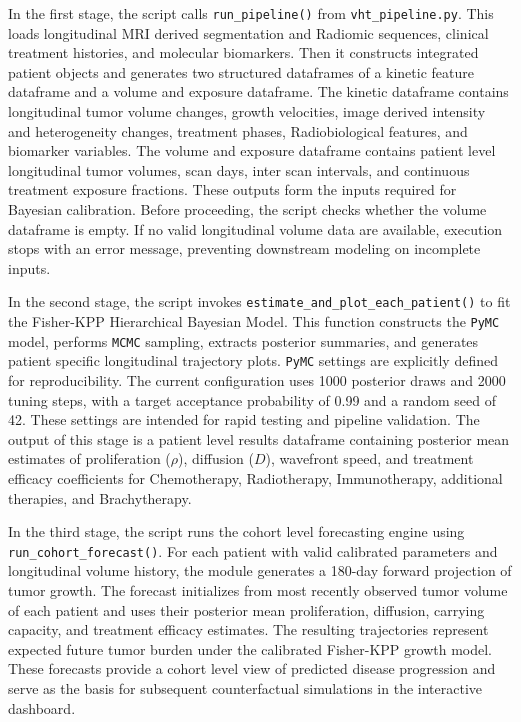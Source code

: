 In the first stage, the script calls \texttt{run\_pipeline()} from \texttt{vht\_pipeline.py}. This loads longitudinal MRI derived segmentation and Radiomic sequences, clinical treatment histories, and molecular biomarkers. Then it constructs integrated patient objects and generates two structured dataframes of a kinetic feature dataframe and a volume and exposure dataframe. The kinetic dataframe contains longitudinal tumor volume changes, growth velocities, image derived intensity and heterogeneity changes, treatment phases, Radiobiological features, and biomarker variables. The volume and exposure dataframe contains patient level longitudinal tumor volumes, scan days, inter scan intervals, and continuous treatment exposure fractions. These outputs form the inputs required for Bayesian calibration. Before proceeding, the script checks whether the volume dataframe is empty. If no valid longitudinal volume data are available, execution stops with an error message, preventing downstream modeling on incomplete inputs.

In the second stage, the script invokes \texttt{estimate\_and\_plot\_each\_patient()} to fit the Fisher-KPP Hierarchical Bayesian Model. This function constructs the \texttt{PyMC} model, performs \texttt{MCMC} sampling, extracts posterior summaries, and generates patient specific longitudinal trajectory plots. \texttt{PyMC} settings are explicitly defined for reproducibility. The current configuration uses 1000 posterior draws and 2000 tuning steps, with a target acceptance probability of 0.99 and a random seed of 42. These settings are intended for rapid testing and pipeline validation. The output of this stage is a patient level results dataframe containing posterior mean estimates of proliferation ($\rho$), diffusion ($D$), wavefront speed, and treatment efficacy coefficients for Chemotherapy, Radiotherapy, Immunotherapy, additional therapies, and Brachytherapy.

In the third stage, the script runs the cohort level forecasting engine using \texttt{run\_cohort\_forecast()}. For each patient with valid calibrated parameters and longitudinal volume history, the module generates a 180-day forward projection of tumor growth. The forecast initializes from most recently observed tumor volume of each patient and uses their posterior mean proliferation, diffusion, carrying capacity, and treatment efficacy estimates. The resulting trajectories represent expected future tumor burden under the calibrated Fisher-KPP growth model. These forecasts provide a cohort level view of predicted disease progression and serve as the basis for subsequent counterfactual simulations in the interactive dashboard.

